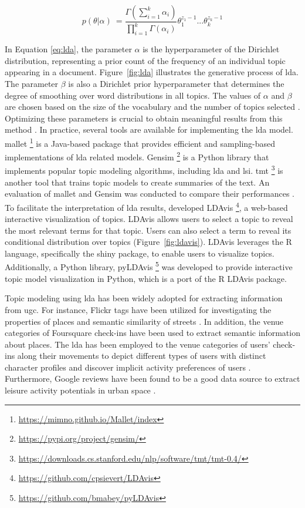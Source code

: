 \documentclass{article}
\begin{document}
\begin{equation} \label{eq:lda}
    p(\theta|\alpha)\ = \frac{\Gamma(\sum_{i=1}^{k} \alpha_{i})}{\prod_{i=1}^{k}\Gamma(\alpha_{i})}\theta_{1}^{z_{1}-1}...\theta_{k}^{z_{k}-1}
\end{equation}

In Equation \ref{eq:lda}, the parameter \(\alpha\) is the hyperparameter of the Dirichlet distribution, representing a prior count of the frequency of an individual topic appearing in a document. Figure~\ref{fig:lda} illustrates the generative process of \acrshort{lda}. The parameter \(\beta\) is also a Dirichlet prior hyperparameter that determines the degree of smoothing over word distributions in all topics. The values of \(\alpha\) and \(\beta\) are chosen based on the size of the vocabulary and the number of topics selected \citep{blei_latent_2003}. Optimizing these parameters is crucial to obtain meaningful results from this method \citep{vayansky_review_2020}. In practice, several tools are available for implementing the \acrshort{lda} model. \acrfull{mallet} \footnote{\url{https://mimno.github.io/Mallet/index}} is a Java-based package that provides efficient and sampling-based implementations of \acrshort{lda} related models. Gensim \footnote{\url{https://pypi.org/project/gensim/}} is a Python library that implements popular topic modeling algorithms, including \acrshort{lda} and \acrshort{lsi}. \acrfull{tmt} \footnote{\url{https://downloads.cs.stanford.edu/nlp/software/tmt/tmt-0.4/}} is another tool that trains topic models to create summaries of the text. An evaluation of \acrshort{mallet} and Gensim was conducted to compare their performances \citep{ebeid_mallet_2016}. To facilitate the interpretation of \acrshort{lda} results, \cite{sievert_ldavis_2014} developed LDAvis \footnote{\url{https://github.com/cpsievert/LDAvis}}, a web-based interactive visualization of topics. LDAvis allows users to select a topic to reveal the most relevant terms for that topic. Users can also select a term to reveal its conditional distribution over topics (Figure~\ref{fig:ldavis}). LDAvis leverages the R language, specifically the shiny package, to enable users to visualize topics. Additionally, a Python library, pyLDAvis \footnote{\url{https://github.com/bmabey/pyLDAvis}} was developed to provide interactive topic model visualization in Python, which is a port of the R LDAvis package.

Topic modeling using \acrshort{lda} has been widely adopted for extracting information from \acrshort{ugc}. For instance, Flickr tags have been utilized for investigating the properties of places and semantic similarity of streets \citep{bahrehdar_description_2018, bahrehdar_streets_2020}. In addition, the venue categories of Foursquare check-ins have been used to extract semantic information about places. The \acrshort{lda} has been employed to the venue categories of users' check-ins along their movements to depict different types of users with distinct character profiles \citep{ferreira_uncovering_2020} and discover implicit activity preferences of users \citep{vu_discovering_2019}. Furthermore, Google reviews have been found to be a good data source to extract leisure activity potentials in urban space \citep{van_weerdenburg_where_2019}.
\end{document}
